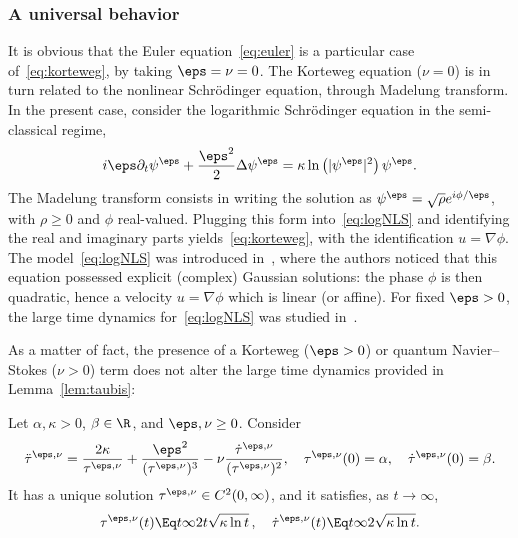 \subsubsection{A universal behavior}

It is obvious that the Euler equation~\eqref{eq:euler} is a particular case of~\eqref{eq:korteweg}, by taking $\eps=\nu=0$. The Korteweg equation ($\nu=0$) is in turn related to the nonlinear Schr\"odinger equation, through Madelung transform. In the present case, consider the logarithmic Schr\"odinger equation in the semi-classical regime,
\begin{equation}\label{eq:logNLS}
i\eps\partial_t \psi^\eps +\frac{\eps^2}{2} \Delta \psi^\eps =\kappa
\ln\left(|\psi^\eps|^2\right)\psi^\eps.
\end{equation}
The Madelung transform consists in writing the solution as $\psi^\eps=\sqrt\rho e^{i\phi/\eps}$, with $\rho\ge 0$ and $\phi$ real-valued. Plugging this form into~\eqref{eq:logNLS} and identifying the real and imaginary parts yields~\eqref{eq:korteweg}, with the identification $u=\nabla \phi$. The model~\eqref{eq:logNLS} was introduced in~\cite{BiMy76}, where the authors noticed that this equation possessed explicit (complex) Gaussian solutions: the phase $\phi$ is then quadratic, hence a velocity $u=\nabla \phi$ which is linear (or affine). For fixed $\eps>0$, the large time dynamics for~\eqref{eq:logNLS} was studied in~\cite{CaGa18}.

As a matter of fact, the presence of a Korteweg ($\eps>0$) or quantum Navier--Stokes ($\nu>0$) term does not alter the large time dynamics provided in Lemma~\ref{lem:taubis}:

\begin{lemm}\label{lem:ODE2}
Let $\alpha,\kappa>0$, $\beta\in \R$, and $\eps,\nu\ge 0$. Consider
\begin{equation}\label{eq:tau-quant}
\ddot \tau^{\eps,\nu} =
\frac{2\kappa }{\tau^{\eps,\nu}}+\frac{\eps^2}{(\tau^{\eps,\nu})^3}-\nu
\frac{\dot \tau^{\eps,\nu}}{(\tau^{\eps,\nu})^2},\quad
\tau^{\eps,\nu}(0)=\alpha,\quad \dot \tau^{\eps,\nu}(0)=\beta.
\end{equation}
It has a unique solution $\tau^{\eps,\nu}\in C^2(0,\infty)$, and it satisfies, as $t\to \infty$,
\begin{equation*}
\tau^{\eps,\nu}(t)\Eq t \infty 2t \sqrt{\kappa \ln t} \,,\quad \dot
\tau^{\eps,\nu}(t)\Eq t \infty 2\sqrt{\kappa\ln t}.
\end{equation*}
\end{lemm}

